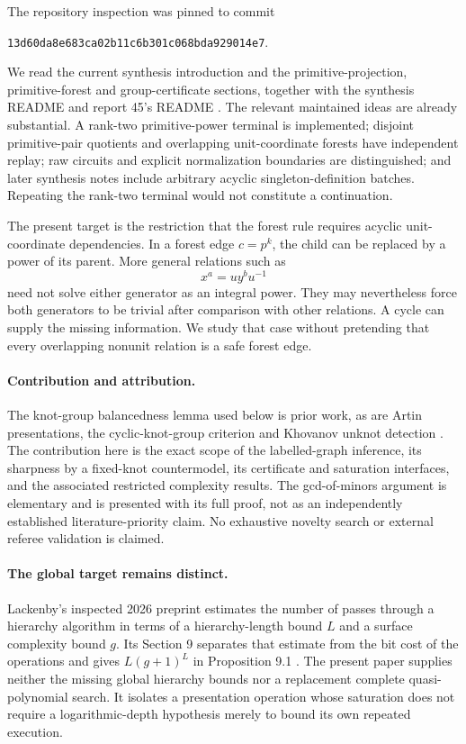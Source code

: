 \documentclass[11pt]{article}
\theoremstyle{definition}\newtheorem{definition}[theorem]{Definition}
\theoremstyle{remark}\newtheorem{remark}[theorem]{Remark}
\begin{document}
The repository inspection was pinned to commit
\begin{center}\small\texttt{13d60da8e683ca02b11c6b301c068bda929014e7}.\end{center}
We read the current synthesis introduction and the primitive-projection,
primitive-forest and group-certificate sections, together with the synthesis
README and report 45's README \cite{Repo}. The relevant maintained ideas
are already substantial. A rank-two primitive-power terminal is implemented;
disjoint primitive-pair quotients and overlapping unit-coordinate forests
have independent replay; raw circuits and explicit normalization boundaries
are distinguished; and later synthesis notes include arbitrary acyclic
singleton-definition batches. Repeating the rank-two terminal would not
constitute a continuation.

The present target is the restriction that the forest rule requires acyclic
unit-coordinate dependencies. In a forest edge $c=p^k$, the child can be
replaced by a power of its parent. More general relations such as
\[
 x^a=u y^b u^{-1}
\]
need not solve either generator as an integral power. They may nevertheless
force both generators to be trivial after comparison with other relations.
A cycle can supply the missing information. We study that case without
pretending that every overlapping nonunit relation is a safe forest edge.

\paragraph{Contribution and attribution.}
The knot-group balancedness lemma used below is prior work, as are Artin
presentations, the cyclic-knot-group criterion and Khovanov unknot detection
\cite{HMT,Gemein,Papakyriakopoulos,KM}. The contribution here is the exact
scope of the labelled-graph inference, its sharpness by a fixed-knot
countermodel, its certificate and saturation interfaces, and the associated
restricted complexity results. The gcd-of-minors argument is elementary
and is presented with its full proof, not as an independently established
literature-priority claim. No exhaustive novelty search or external referee
validation is claimed.

\paragraph{The global target remains distinct.}
Lackenby's inspected 2026 preprint estimates the number of passes through a
hierarchy algorithm in terms of a hierarchy-length bound $L$ and a surface
complexity bound $g$. Its Section 9 separates that estimate from the bit
cost of the operations and gives $L(g+1)^L$ in Proposition 9.1
\cite{Lackenby}. The present paper supplies neither the missing global
hierarchy bounds nor a replacement complete quasi-polynomial search. It
isolates a presentation operation whose saturation does not require a
logarithmic-depth hypothesis merely to bound its own repeated execution.
\end{document}
